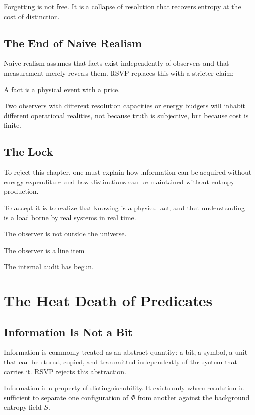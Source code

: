 \documentclass[11pt]{book}
\begin{document}
Forgetting is not free. It is a collapse of resolution that recovers entropy at the cost of distinction.

\section{The End of Naive Realism}

Naive realism assumes that facts exist independently of observers and that measurement merely reveals them. RSVP replaces this with a stricter claim:

A fact is a physical event with a price.

Two observers with different resolution capacities or energy budgets will inhabit different operational realities, not because truth is subjective, but because cost is finite.

\section{The Lock}

To reject this chapter, one must explain how information can be acquired without energy expenditure and how distinctions can be maintained without entropy production.

To accept it is to realize that knowing is a physical act, and that understanding is a load borne by real systems in real time.

The observer is not outside the universe.

The observer is a line item.

The internal audit has begun.


\chapter{The Heat Death of Predicates}

\section{Information Is Not a Bit}

Information is commonly treated as an abstract quantity: a bit, a symbol, a unit that can be stored, copied, and transmitted independently of the system that carries it. RSVP rejects this abstraction.

Information is a property of distinguishability. It exists only where resolution is sufficient to separate one configuration of \(\Phi\) from another against the background entropy field \(S\).
\end{document}
